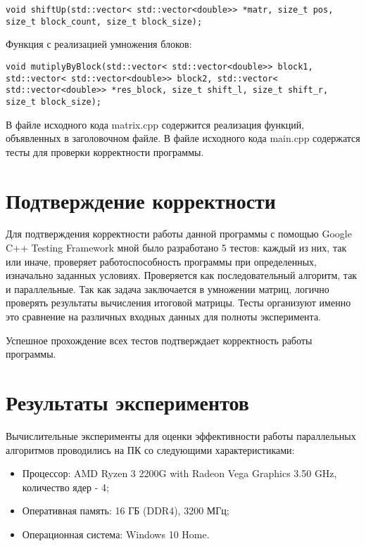 \documentclass{report}
\begin{document}
\begin{lstlisting}
void shiftUp(std::vector< std::vector<double>> *matr, size_t pos, size_t block_count, size_t block_size);
\end{lstlisting}
\par Функция с реализацией умножения блоков:
\begin{lstlisting}
void mutiplyByBlock(std::vector< std::vector<double>> block1, std::vector< std::vector<double>> block2, std::vector< std::vector<double>> *res_block, size_t shift_l, size_t shift_r, size_t block_size);
\end{lstlisting}
\par В файле исходного кода matrix.cpp содержится реализация функций, объявленных в заголовочном файле. В файле исходного кода main.cpp содержатся тесты для проверки корректности программы.
\newpage

\section*{Подтверждение корректности}
Для подтверждения корректности работы данной программы с помощью Google C++ Testing Framework мной было разработано 5 тестов: каждый из них, так или иначе, проверяет работоспособность программы при определенных, изначально заданных условиях. Проверяется как последовательный алгоритм, так и параллельные. Так как задача заключается в умножении матриц, логично проверять результаты вычисления итоговой матрицы. Тесты организуют именно это сравнение на различных входных данных для полноты эксперимента.

\par Успешное прохождение всех тестов подтверждает корректность работы программы.
\newpage

\section*{Результаты экспериментов}
Вычислительные эксперименты для оценки эффективности работы параллельных алгоритмов проводились на ПК со следующими характеристиками:
\begin{itemize}
\item Процессор: AMD Ryzen 3 2200G with Radeon Vega Graphics 3.50 GHz, количество ядер - 4;
\item Оперативная память: 16 ГБ (DDR4), 3200 МГц;
\item Операционная система: Windows 10 Home.
\end{itemize}
\end{document}
